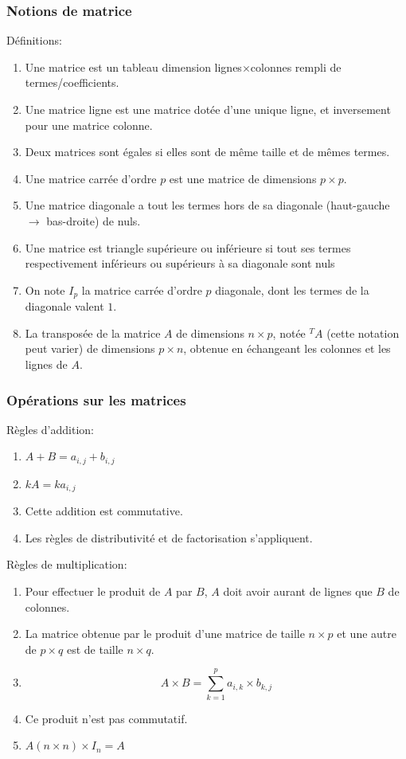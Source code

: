 \documentclass{article}
\begin{document}
\subsubsection{Notions de matrice}
    Définitions:
    \begin{enumerate}
        \item Une matrice est un tableau dimension lignes$\times$colonnes rempli de termes/coefficients.
        \item Une matrice ligne est une matrice dotée d'une unique ligne, et inversement pour une matrice colonne.
        \item Deux matrices sont égales si elles sont de même taille et de mêmes termes.
        \item Une matrice carrée d'ordre $p$ est une matrice de dimensions $p\times p$.
        \item Une matrice diagonale a tout les termes hors de sa diagonale (haut-gauche $\rightarrow$ bas-droite) de nuls.
        \item Une matrice est triangle supérieure ou inférieure si tout ses termes respectivement inférieurs ou supérieurs à sa diagonale sont nuls
        \item On note $I_p$ la matrice carrée d'ordre $p$ diagonale, dont les termes de la diagonale valent $1$.
        \item La transposée de la matrice $A$ de dimensions $n\times p$, notée $^TA$ (cette notation peut varier) de dimensions $p\times n$, obtenue en échangeant les colonnes et les lignes de $A$.
    \end{enumerate}

\subsubsection{Opérations sur les matrices}
    Règles d'addition:
    \begin{enumerate}
        \item $A+B = a_{i,j}+b_{i,j}$
        \item $kA = ka_{i,j}$
        \item Cette addition est commutative.
        \item Les règles de distributivité et de factorisation s'appliquent.
    \end{enumerate}
    \hfill \break
    Règles de multiplication:
    \begin{enumerate}
        \item Pour effectuer le produit de $A$ par $B$, $A$ doit avoir aurant de lignes que $B$ de colonnes.
        \item La matrice obtenue par le produit d'une matrice de taille $n \times p$ et une autre de $p \times q$ est de taille $n \times q$.
        \item $$A\times B=\sum_{k=1}^{p} a_{i,k} \times b_{k,j}$$
        \item Ce produit n'est pas commutatif.
        \item $A(n\times n) \times I_n = A$
    \end{enumerate}
\end{document}
